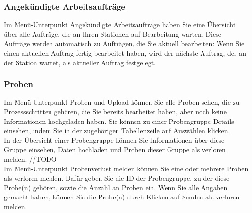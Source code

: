 \documentclass[enabledeprecatedfontcommands,fontsize=12pt,paper=a4,twoside]{scrartcl}
\begin{document}
\subsubsection{Angekündigte Arbeitsaufträge}
Im Menü-Unterpunkt Angekündigte Arbeitsaufträge haben Sie eine Übersicht über alle Aufträge, die an Ihren Stationen auf Bearbeitung warten. Diese Aufträge werden automatisch zu Aufträgen, die Sie aktuell bearbeiten: Wenn Sie einen aktuellen Auftrag fertig bearbeitet haben, wird der nächste Auftrag, der an der Station wartet, als aktueller Auftrag festgelegt. \\

\subsubsection{Proben}
Im Menü-Unterpunkt Proben und Upload können Sie alle Proben sehen, die zu Prozessschritten gehören, die Sie bereits bearbeitet haben, aber noch keine Informationen hochgeladen haben. Sie können zu einer Probengruppe Details einsehen, indem Sie in der zugehörigen Tabellenzeile auf Auswählen klicken.\\

In der Übersicht einer Probengruppe können Sie Informationen über diese Gruppe einsehen, Daten hochladen und Proben dieser Gruppe als verloren melden. //TODO \\

Im Menü-Unterpunkt Probenverlust melden können Sie eine oder mehrere Proben als verloren melden. Dafür geben Sie die ID der Probengruppe, zu der diese Probe(n) gehören, sowie die Anzahl an Proben ein. Wenn Sie alle Angaben gemacht haben, können Sie die Probe(n) durch Klicken auf Senden als verloren melden. \\
\end{document}
